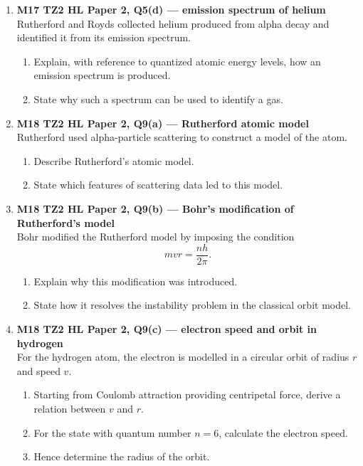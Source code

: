 \documentclass[11pt]{article}
\begin{document}
\begin{enumerate}[leftmargin=*, itemsep=1.2em]

\item \textbf{M17 TZ2 HL Paper 2, Q5(d) --- emission spectrum of helium}\\
Rutherford and Royds collected helium produced from alpha decay and identified it from its emission spectrum.
\begin{enumerate}[label=(\alph*)]
\item Explain, with reference to quantized atomic energy levels, how an emission spectrum is produced.
\item State why such a spectrum can be used to identify a gas.
\end{enumerate}

\item \textbf{M18 TZ2 HL Paper 2, Q9(a) --- Rutherford atomic model}\\
Rutherford used alpha-particle scattering to construct a model of the atom.
\begin{enumerate}[label=(\alph*)]
\item Describe Rutherford's atomic model.
\item State which features of scattering data led to this model.
\end{enumerate}

\item \textbf{M18 TZ2 HL Paper 2, Q9(b) --- Bohr's modification of Rutherford's model}\\
Bohr modified the Rutherford model by imposing the condition
\[
mvr=\frac{nh}{2\pi}.
\]
\begin{enumerate}[label=(\alph*)]
\item Explain why this modification was introduced.
\item State how it resolves the instability problem in the classical orbit model.
\end{enumerate}

\item \textbf{M18 TZ2 HL Paper 2, Q9(c) --- electron speed and orbit in hydrogen}\\
For the hydrogen atom, the electron is modelled in a circular orbit of radius $r$ and speed $v$.
\begin{enumerate}[label=(\alph*)]
\item Starting from Coulomb attraction providing centripetal force, derive a relation between $v$ and $r$.
\item For the state with quantum number $n=6$, calculate the electron speed.
\item Hence determine the radius of the orbit.
\end{enumerate}


\end{enumerate}
\end{document}
